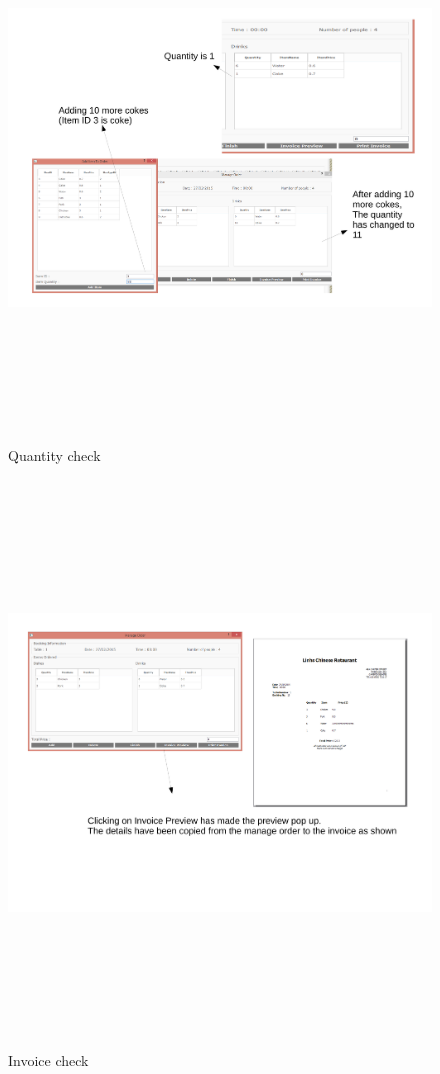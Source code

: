 \begin{landscape}
\begin{figure}[H]
    \includegraphics[height = 15cm]{./Testing/images/Test6.pdf}
    \caption{Quantity check} \label{fig:Test6}
\end{figure}

\begin{figure}[H]
    \includegraphics[height = 15cm]{./Testing/images/Test7.pdf}
    \caption{Invoice check} \label{fig:Test7}
\end{figure}


\end{landscape}
